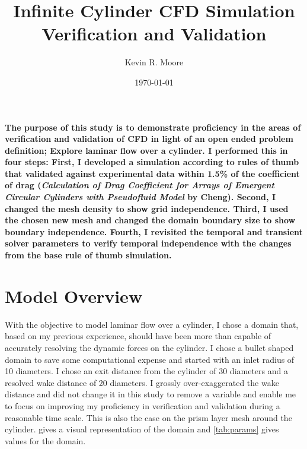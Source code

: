 \documentclass[10pt,english]{article}
\title{\vspace{-20pt}Infinite Cylinder CFD Simulation Verification and Validation}
\author{Kevin R. Moore}
\affil{\vspace{-5pt}Brigham Young University}
\date{\vspace{-10pt}\today}
\begin{document}
\maketitle
\vspace{-10pt}
   \textbf{The purpose of this study is to demonstrate proficiency in the areas of verification and validation of CFD in light of an open ended problem definition; Explore laminar flow over a cylinder.  I performed this in four steps: First, I developed a simulation according to rules of thumb that validated against experimental data within 1.5\% of the coefficient of drag (\textit{Calculation of Drag Coefficient for Arrays of Emergent Circular Cylinders with Pseudofluid Model} by Cheng).  Second, I changed the mesh density to show grid independence.  Third, I used the chosen new mesh and changed the domain boundary size to show boundary independence.  Fourth, I revisited the temporal and transient solver parameters to verify temporal independence with the changes from the base rule of thumb simulation. }

\vspace{0pt}

\section{Model Overview}

With the objective to model laminar flow over a cylinder, I chose a domain that, based on my previous experience, should have been more than capable of accurately resolving the dynamic forces on the cylinder.  I chose a bullet shaped domain to save some computational expense and started with an inlet radius of 10 diameters.  I chose an exit distance from the cylinder of 30 diameters and a resolved wake distance of 20 diameters.  I grossly over-exaggerated the wake distance and did not change it in this study to remove a variable and enable me to focus on improving my proficiency in verification and validation during a reasonable time scale.  This is also the case on the prism layer mesh around the cylinder.   gives a visual representation of the domain and \cref{tab:params} gives values for the domain.


\end{document}
